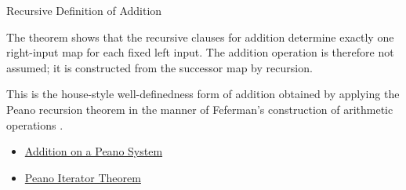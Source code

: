 \begin{topicbox}{Recursive Definition of Addition}
\begin{remark*}[Interpretation]
The theorem shows that the recursive clauses for addition determine exactly one
right-input map for each fixed left input. The addition operation is therefore
not assumed; it is constructed from the successor map by recursion.
\end{remark*}

\begin{remark*}
This is the house-style well-definedness form of addition obtained by applying
the Peano recursion theorem in the manner of Feferman's construction of
arithmetic operations \citep{FefermanNumberSystems1964}.
\end{remark*}

\begin{dependencies}
\begin{itemize}
  \item \hyperref[def:addition-on-peano-system]{Addition on a Peano System}
  \item \hyperref[thm:peano-iterator-theorem]{Peano Iterator Theorem}
\end{itemize}
\end{dependencies}
\end{topicbox}

